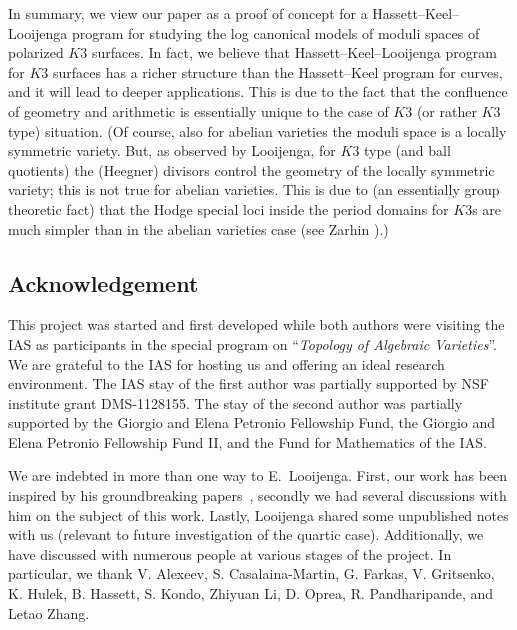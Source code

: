 \documentclass[11pt]{amsart}
\numberwithin{equation}{subsection}
\theoremstyle{plain}
\theoremstyle{remark}
\theoremstyle{definition}
\begin{document}
\medskip

In summary, we view our paper as a proof of concept for a Hassett--Keel--Looijenga program for studying the log canonical models of moduli spaces of polarized $K3$ surfaces.  In fact, we believe that Hassett--Keel--Looijenga program for $K3$ surfaces has a richer structure than the Hassett--Keel program for curves, and it will lead to deeper applications. This is due to the fact that the confluence of geometry and arithmetic is essentially unique to the case of $K3$ (or rather $K3$ type) situation. (Of course, also for abelian varieties the moduli space is a locally symmetric variety. But, as observed by Looijenga, for $K3$ type (and ball quotients) the (Heegner) divisors control the geometry of the locally symmetric variety; this is not true for abelian varieties.
 This is due to (an essentially group theoretic fact) that the Hodge special loci inside the period domains for $K3$s are much simpler than in the abelian varieties case (see Zarhin \cite{zarhin}).)

\subsection*{Acknowledgement}
This project was started and first developed while both authors were visiting the IAS as participants in the special program on ``{\it Topology of Algebraic Varieties}''. We are grateful to the IAS for hosting us and offering an ideal research environment. The IAS stay of the first author was partially supported by NSF institute grant DMS-1128155. The stay of the second author was partially supported by the Giorgio and Elena Petronio Fellowship Fund, the Giorgio and Elena Petronio
Fellowship Fund II, and the Fund for Mathematics of the IAS.

\smallskip

We are indebted in more than one way to E.~Looijenga. First, our work has been inspired by his groundbreaking papers~\cite{looijenga1,looijengacompact}, secondly 
  we had several discussions with him on the subject of this work.  Lastly, Looijenga shared some unpublished notes with us (relevant to future investigation of the quartic case). Additionally, we have discussed with numerous people at various stages of the project. In particular, we thank V. Alexeev, S. Casalaina-Martin, G. Farkas, V. Gritsenko, K. Hulek, B. Hassett, S. Kondo, Zhiyuan Li, D. Oprea, R. Pandharipande, and Letao Zhang. 


\end{document}
